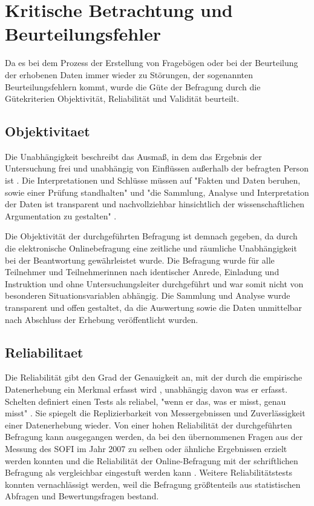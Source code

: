 \section{Kritische Betrachtung und Beurteilungsfehler}

Da es bei dem Prozess der Erstellung von Fragebögen oder bei der Beurteilung der erhobenen Daten immer wieder zu Störungen, der sogenannten Beurteilungsfehlern kommt, wurde die Güte der Befragung durch die Gütekriterien Objektivität, Reliabilität und Validität beurteilt.

\subsection{Objektivitaet}

Die Unabhängigkeit beschreibt das Ausmaß, in dem das Ergebnis der Untersuchung frei und unabhängig von Einflüssen außerhalb der befragten Person ist \cite{rost_2004_lehrbuch}. Die Interpretationen und Schlüsse müssen auf "Fakten und Daten beruhen, sowie einer Prüfung standhalten" und "die Sammlung, Analyse und Interpretation der Daten ist transparent und nachvollziehbar hinsichtlich der wissenschaftlichen Argumentation zu gestalten" \cite{Bargheer_2015}.

Die Objektivität der durchgeführten Befragung ist demnach gegeben, da durch die elektronische Onlinebefragung eine zeitliche und räumliche Unabhängigkeit bei der Beantwortung gewährleistet wurde. Die Befragung wurde für alle Teilnehmer und Teilnehmerinnen nach identischer Anrede, Einladung und Instruktion und ohne Untersuchungsleiter durchgeführt und war somit nicht von besonderen Situationsvariablen abhängig. Die Sammlung und Analyse wurde transparent und offen gestaltet, da die Auswertung sowie die Daten unmittelbar nach Abschluss der Erhebung veröffentlicht wurden.

\subsection{Reliabilitaet}

Die Reliabilität gibt den Grad der Genauigkeit an, mit der durch die empirische Datenerhebung ein Merkmal erfasst wird \cite{rost_2004_lehrbuch}, unabhängig davon was er erfasst. Schelten definiert einen Tests als reliabel, "wenn er das, was er misst, genau misst" \cite{schelten_1997_testbeurteilung}.  Sie spiegelt die Replizierbarkeit von Messergebnissen und Zuverlässigkeit einer Datenerhebung wieder. Von einer hohen Reliabilität der durchgeführten Befragung kann ausgegangen werden, da bei den übernommenen Fragen aus der Messung des SOFI im Jahr 2007 zu selben oder ähnliche Ergebnissen erzielt werden konnten und die Reliabilität der Online-Befragung mit der schriftlichen Befragung als vergleichbar eingestuft werden kann \cite{suchen_DOI_10.1007/978-3-663-10948-8_10}. Weitere Reliabilitätstests konnten vernachlässigt werden, weil die Befragung größtenteils aus statistischen Abfragen und Bewertungsfragen bestand.

